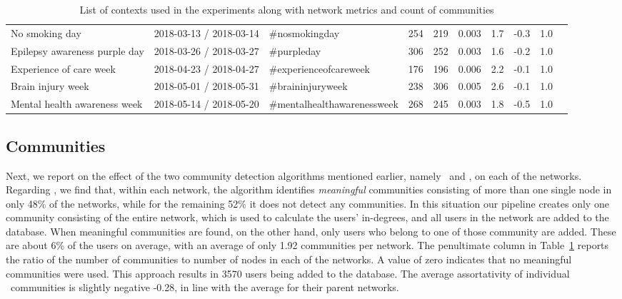 \documentclass[runningheads]{llncs}
\begin{document}
\begin{table}
{\begin{tabularx}{\textwidth}{|X|X|X|X|X|X|X|X|X|X|}
                  No smoking day &  2018-03-13 / 2018-03-14 &               \#nosmokingday &    254 &    219 &    0.003 &         1.7 &           -0.3 &          1.0 \\
   Epilepsy awareness purple day &  2018-03-26 / 2018-03-27 &                  \#purpleday &    306 &    252 &    0.003 &         1.6 &           -0.2 &          1.0 \\
         Experience of care week &  2018-04-23 / 2018-04-27 &       \#experienceofcareweek &    176 &    196 &    0.006 &         2.2 &           -0.1 &          1.0 \\
               Brain injury week &  2018-05-01 / 2018-05-31 &            \#braininjuryweek &    238 &    306 &    0.005 &         2.6 &           -0.1 &          1.0 \\
    Mental health awareness week &  2018-05-14 / 2018-05-20 &  \#mentalhealthawarenessweek &    268 &    245 &    0.003 &         1.8 &           -0.5 &          1.0 \\
\bottomrule
\end{tabularx}
	}
	
	\caption{List of contexts used in the experiments along with network metrics and count of \demon communities}
	\label{tab:contexts}
\end{table}

\subsection{Communities}  \label{sec:communities}

Next, we report on the effect of the two community detection algorithms mentioned earlier, namely \demon~and \infomap, on each of the networks. 
%
Regarding \demon, we find that, within each network, the algorithm  identifies \textit{meaningful} communities consisting of more than one single node in only 48\% of the networks, while for the remaining 52\% 
it does not detect any communities.
In this situation our pipeline creates only one community consisting of the entire network, which is used to calculate the users' in-degrees, and all users in the network are added to the database.
%
When meaningful communities are found, on the other hand, only users who belong to one of those community are added. 
These are about 6\% of the users on average, with an average of only 1.92 communities per network.
The penultimate column in Table~\ref{tab:contexts} reports the ratio of the number of communities to number of nodes in each of the networks. 
A value of zero indicates that no meaningful communities were used.
%
This approach results in 3570 users being added to the database.
The average assortativity of individual \demon~communities is slightly negative -0.28, in line with the average for their parent networks.
\end{document}
